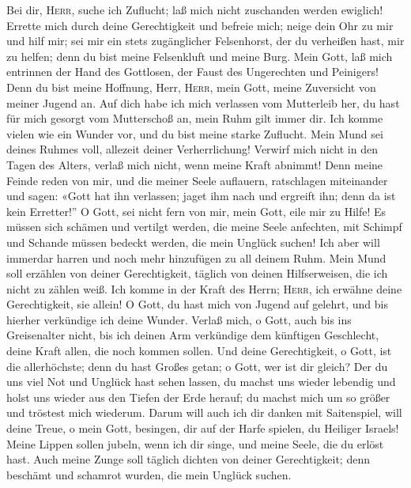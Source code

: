 Bei dir, \textsc{Herr}, suche ich Zuflucht; laß mich
nicht zuschanden werden ewiglich!  Errette mich durch
deine Gerechtigkeit und befreie mich; neige dein Ohr zu mir und hilf
mir;  sei mir ein stets zugänglicher Felsenhorst, der du
verheißen hast, mir zu helfen; denn du bist meine Felsenkluft und meine
Burg.  Mein Gott, laß mich entrinnen der Hand des
Gottlosen, der Faust des Ungerechten und Peinigers!  Denn
du bist meine Hoffnung, Herr, \textsc{Herr}, mein Gott, meine Zuversicht
von meiner Jugend an.  Auf dich habe ich mich verlassen
vom Mutterleib her, du hast für mich gesorgt vom Mutterschoß an, mein
Ruhm gilt immer dir.  Ich komme vielen wie ein Wunder vor,
und du bist meine starke Zuflucht.  Mein Mund sei deines
Ruhmes voll, allezeit deiner Verherrlichung!  Verwirf mich
nicht in den Tagen des Alters, verlaß mich nicht, wenn meine Kraft
abnimmt!  Denn meine Feinde reden von mir, und die meiner
Seele auflauern, ratschlagen miteinander  und sagen:
«Gott hat ihn verlassen; jaget ihm nach und ergreift ihn; denn da ist
kein Erretter!''  O Gott, sei nicht fern von mir, mein
Gott, eile mir zu Hilfe!  Es müssen sich schämen und
vertilgt werden, die meine Seele anfechten, mit Schimpf und Schande
müssen bedeckt werden, die mein Unglück suchen!  Ich aber
will immerdar harren und noch mehr hinzufügen zu all deinem Ruhm.
 Mein Mund soll erzählen von deiner Gerechtigkeit,
täglich von deinen Hilfserweisen, die ich nicht zu zählen weiß.
 Ich komme in der Kraft des Herrn; \textsc{Herr}, ich
erwähne deine Gerechtigkeit, sie allein!  O Gott, du hast
mich von Jugend auf gelehrt, und bis hierher verkündige ich deine
Wunder.  Verlaß mich, o Gott, auch bis ins Greisenalter
nicht, bis ich deinen Arm verkündige dem künftigen Geschlecht, deine
Kraft allen, die noch kommen sollen.  Und deine
Gerechtigkeit, o Gott, ist die allerhöchste; denn du hast Großes getan;
o Gott, wer ist dir gleich?  Der du uns viel Not und
Unglück hast sehen lassen, du machst uns wieder lebendig und holst uns
wieder aus den Tiefen der Erde herauf;  du machst mich um
so größer und tröstest mich wiederum.  Darum will auch
ich dir danken mit Saitenspiel, will deine Treue, o mein Gott, besingen,
dir auf der Harfe spielen, du Heiliger Israels!  Meine
Lippen sollen jubeln, wenn ich dir singe, und meine Seele, die du erlöst
hast.  Auch meine Zunge soll täglich dichten von deiner
Gerechtigkeit; denn beschämt und schamrot wurden, die mein Unglück
suchen.

